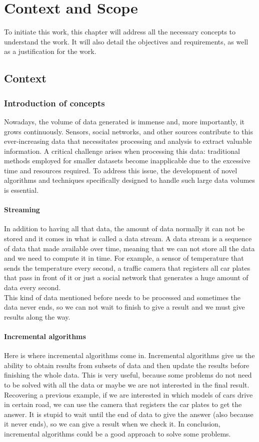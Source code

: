 \chapter{Context and Scope}
To initiate this work, this chapter will address all the necessary concepts to understand the work.
It will also detail the objectives and requirements, as well as a justification for the work.
\section{Context}
\subsection{Introduction of concepts}
Nowadays, the volume of data generated is immense and, more importantly, it grows continuously.
Sensors, social networks, and other sources contribute to this ever-increasing data that necessitates processing and analysis to extract valuable information.
A critical challenge arises when processing this data: traditional methods employed for smaller datasets become inapplicable due to the excessive time and resources required.
To address this issue, the development of novel algorithms and techniques specifically designed to handle such large data volumes is essential.
\subsubsection*{Streaming}
In addition to having all that data, the amount of data normally it can not be stored and it comes in what is called a data stream.
A data stream is a sequence of data that made available over time, meaning that we can not store all the data and we need to compute it in time.
For example, a sensor of temperature that sends the temperature every second, a traffic camera that registers all car plates that pass in front of it or just a social network that generates a huge amount of data every second.\\
This kind of data mentioned before needs to be processed and sometimes the data never ends, so we can not wait to finish to give a result and we must give results along the way.
\subsubsection*{Incremental algorithms}
Here is where incremental algorithms come in.
Incremental algorithms give us the ability to obtain results from subsets of data and then update the results before finishing the whole data.
This is very useful, because some problems do not need to be solved with all the data or maybe we are not interested in the final result.
Recovering a previous example, if we are interested in which models of cars drive in certain road, we can use the camera that registers the car plates to get the answer.
It is stupid to wait until the end of data to give the answer (also because it never ends), so we can give a result when we check it.
In conclusion, incremental algorithms could be a good approach to solve some problems.
